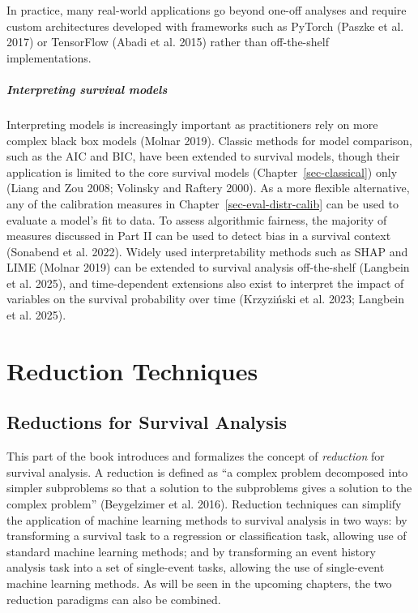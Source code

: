\documentclass[
  letterpaper,
  krantz2]{style/krantz}
\begin{document}
In practice, many real-world applications go beyond one-off analyses and
require custom architectures developed with frameworks such as PyTorch
(Paszke et al. 2017) or TensorFlow (Abadi et al. 2015) rather than
off-the-shelf implementations.

\subsubsection*{Interpreting survival
models}\label{interpreting-survival-models}

Interpreting models is increasingly important as practitioners rely on
more complex black box models (Molnar 2019). Classic methods for model
comparison, such as the AIC and BIC, have been extended to survival
models, though their application is limited to the core survival models
(Chapter~\ref{sec-classical}) only (Liang and Zou 2008; Volinsky and
Raftery
2000). As a
more flexible alternative, any of the calibration measures in
Chapter~\ref{sec-eval-distr-calib} can be used to evaluate a model's fit
to data. To assess algorithmic fairness, the majority
of measures discussed in Part II can be used to detect bias in a
survival context (Sonabend et al. 2022). Widely used
interpretability methods such as SHAP and LIME (Molnar 2019) can be
extended to survival analysis off-the-shelf (Langbein et al. 2025), and
time-dependent extensions also exist to interpret the impact of
variables on the survival probability over time (Krzyziński et al. 2023;
Langbein et al. 2025).

\part{Reduction Techniques}

\chapter{Reductions for Survival
Analysis}\label{sec-reduction-techniques}

This part of the book introduces and formalizes the concept of
\emph{reduction} for survival analysis. A reduction is
defined as ``a complex problem decomposed into simpler subproblems so
that a solution to the subproblems gives a solution to the complex
problem'' (Beygelzimer et al. 2016). Reduction techniques can simplify
the application of machine learning methods to survival analysis in two
ways: by transforming a survival task to a regression or classification
task, allowing use of standard machine learning methods; and by
transforming an event history analysis task into a set of single-event
tasks, allowing the use of single-event machine learning methods. As
will be seen in the upcoming chapters, the two reduction paradigms can
also be combined.
\end{document}
